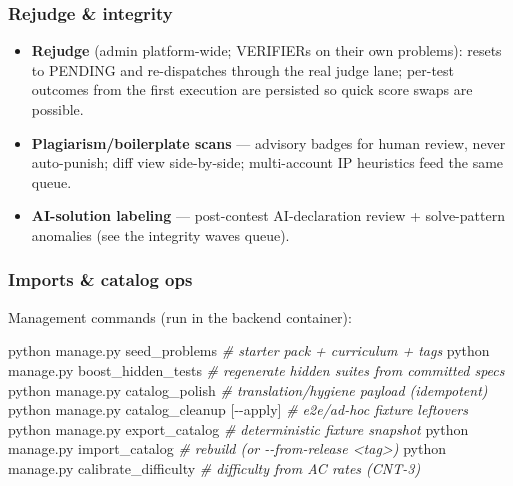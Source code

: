 \documentclass[
]{article}
\newenvironment{Shaded}{}{}
\newcommand{\CommentTok}[1]{\textcolor[rgb]{0.38,0.63,0.69}{\textit{#1}}}
\newcommand{\ExtensionTok}[1]{#1}
\newcommand{\NormalTok}[1]{#1}
\newcommand{\PreprocessorTok}[1]{\textcolor[rgb]{0.74,0.48,0.00}{#1}}
\newcommand{\SpecialStringTok}[1]{\textcolor[rgb]{0.73,0.40,0.53}{#1}}
\providecommand{\tightlist}{%
  \setlength{\itemsep}{0pt}\setlength{\parskip}{0pt}}
\begin{document}
\subsubsection{Rejudge \& integrity}\label{rejudge--integrity}

\begin{itemize}
\tightlist
\item
  \textbf{Rejudge} (admin platform-wide; VERIFIERs on their own
  problems): resets to PENDING and re-dispatches through the real judge
  lane; per-test outcomes from the first execution are persisted so
  quick score swaps are possible.
\item
  \textbf{Plagiarism/boilerplate scans} --- advisory badges for human
  review, never auto-punish; diff view side-by-side; multi-account IP
  heuristics feed the same queue.
\item
  \textbf{AI-solution labeling} --- post-contest AI-declaration review +
  solve-pattern anomalies (see the integrity wave\textquotesingle s
  queue).
\end{itemize}

\subsubsection{Imports \& catalog ops}\label{imports--catalog-ops}

Management commands (run in the backend container):

\begin{Shaded}
\begin{Highlighting}[]
\ExtensionTok{python}\NormalTok{ manage.py seed\_problems            }\CommentTok{\# starter pack + curriculum + tags}
\ExtensionTok{python}\NormalTok{ manage.py boost\_hidden\_tests       }\CommentTok{\# regenerate hidden suites from committed specs}
\ExtensionTok{python}\NormalTok{ manage.py catalog\_polish           }\CommentTok{\# translation/hygiene payload (idempotent)}
\ExtensionTok{python}\NormalTok{ manage.py catalog\_cleanup }\PreprocessorTok{[{-}{-}}\SpecialStringTok{apply}\PreprocessorTok{]}  \CommentTok{\# e2e/ad{-}hoc fixture leftovers}
\ExtensionTok{python}\NormalTok{ manage.py export\_catalog           }\CommentTok{\# deterministic fixture snapshot}
\ExtensionTok{python}\NormalTok{ manage.py import\_catalog           }\CommentTok{\# rebuild (or {-}{-}from{-}release \textless{}tag\textgreater{})}
\ExtensionTok{python}\NormalTok{ manage.py calibrate\_difficulty     }\CommentTok{\# difficulty from AC rates (CNT{-}3)}
\end{Highlighting}
\end{Shaded}
\end{document}
